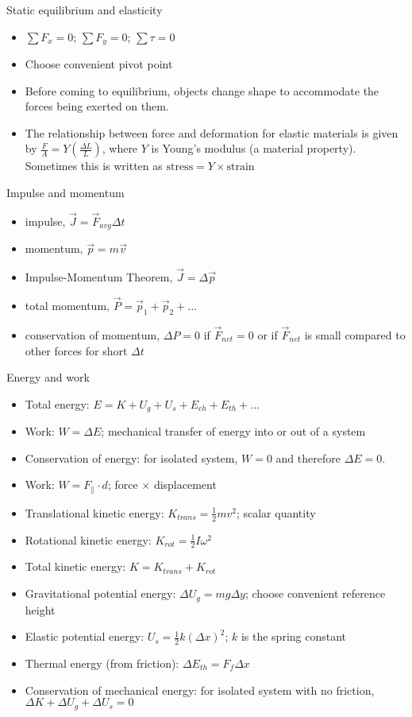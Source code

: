 \documentclass[11pt,letterpaper]{article}
\begin{document}
\noindent Static equilibrium and elasticity
\begin{itemize}
\item $\sum{F_x}=0$; $\sum{F_y}=0$; $\sum\tau=0$
\item Choose convenient pivot point
\item Before coming to equilibrium, objects change shape to accommodate the forces being exerted on them.
\item The relationship between force and deformation for elastic materials is given by $\displaystyle\frac{F}{A}=Y\left(\displaystyle\frac{\Delta{L}}{L}\right)$, where $Y$ is Young's modulus (a material property). Sometimes this is written as $\mbox{stress}=Y\times\mbox{strain}$
\end{itemize}

\noindent Impulse and momentum
\begin{itemize}
\item impulse, $\vec{J}=\vec{F}_{avg}\Delta{t}$
\item momentum, $\vec{p}=m\vec{v}$
\item Impulse-Momentum Theorem, $\vec{J}=\Delta{\vec{p}}$
\item total momentum, $\vec{P}=\vec{p}_1+\vec{p}_2+...$
\item conservation of momentum, $\Delta{P}=0$ if $\vec{F}_{net}=0$ or if $\vec{F}_{net}$ is small compared to other forces for short $\Delta{t}$
\end{itemize}

\noindent Energy and work
\begin{itemize}
\item Total energy: $E=K+U_g+U_s+E_{ch}+E_{th}+...$
\item Work: $W=\Delta{E}$; mechanical transfer of energy into or out of a system
\item Conservation of energy: for isolated system, $W=0$ and therefore $\Delta{E}=0$.
\item Work: $W=F_\parallel\cdot{d}$; force $\times$ displacement
\item Translational kinetic energy: $K_{trans}=\displaystyle\frac{1}{2}mv^2$; scalar quantity
\item Rotational kinetic energy: $K_{rot}=\displaystyle\frac{1}{2}I\omega^2$
\item Total kinetic energy: $K=K_{trans}+K_{rot}$
\item Gravitational potential energy: $\Delta{U_g}=mg\Delta{y}$; choose convenient reference height
\item Elastic potential energy: $U_s=\displaystyle\frac{1}{2}k(\Delta{x})^2$; $k$ is the spring constant
\item Thermal energy (from friction): $\Delta{E_{th}}=F_f\Delta{x}$
\item Conservation of mechanical energy: for isolated system with no friction, $\Delta{K}+\Delta{U_g}+\Delta{U_s}=0$
\end{itemize}
\end{document}
